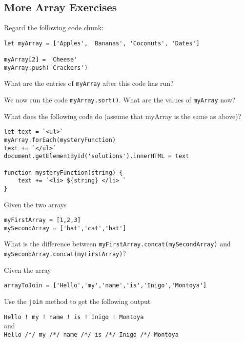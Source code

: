 \documentclass[english,11pt,a4paper]{report}
\begin{document}
\printcursols


\newpage

\subsection{More Array Exercises}
\begin{ex}
Regard the following code chunk:
\begin{verbatim}
let myArray = ['Apples', 'Bananas', 'Coconuts', 'Dates']

myArray[2] = 'Cheese'
myArray.push('Crackers')
\end{verbatim}
What are the entries of \verb|myArray| after this code has run?
\end{ex}

\begin{ex}
We now run the code \verb|myArray.sort()|. What are the values of \verb|myArray| now?
\end{ex}

\begin{ex}
What does the following code do (assume that myArray is the same as above)?
\begin{verbatim}
let text = `<ul>`
myArray.forEach(mysteryFunction) 
text += `</ul>`
document.getElementById('solutions').innerHTML = text

function mysteryFunction(string) {
    text += `<li> ${string} </li> `
}
\end{verbatim}
\end{ex}

\begin{ex}
Given the two arrays
\begin{verbatim}
myFirstArray = [1,2,3]
mySecondArray = ['hat','cat','bat']
\end{verbatim}
What is the difference between \verb|myFirstArray.concat(mySecondArray)| and \verb|mySecondArray.concat(myFirstArray)|?
\end{ex}

\begin{ex}
Given the array 

\verb|arrayToJoin = ['Hello','my','name','is','Inigo','Montoya']|

Use the \verb|join| method to get the following output

\verb|Hello ! my ! name ! is ! Inigo ! Montoya|\\
and \\
\verb|Hello /*/ my /*/ name /*/ is /*/ Inigo /*/ Montoya|
\end{ex}
\end{document}
